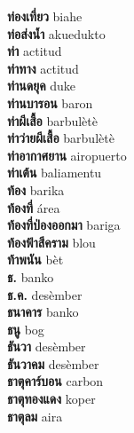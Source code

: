 \textbf{ ท่องเที่ยว  } biahe \\
\textbf{ ท่อส่งน้ำ  } akuedukto \\
\textbf{ ท่า  } actitud \\
\textbf{ ท่าทาง  } actitud \\
\textbf{ ท่านดยุค  } duke \\
\textbf{ ท่านบารอน  } baron \\
\textbf{ ท่าผีเสื้อ  } barbulètè \\
\textbf{ ท่าว่ายผีเสื้อ  } barbulètè \\
\textbf{ ท่าอากาศยาน  } airopuerto \\
\textbf{ ท่าเต้น  } baliamentu \\
\textbf{ ท้อง  } barika \\
\textbf{ ท้องที่  } área \\
\textbf{ ท้องที่ป่องออกมา  } bariga \\
\textbf{ ท้องฟ้าสีคราม  } blou \\
\textbf{ ท้าพนัน  } bèt \\
\textbf{ ธ.  } banko \\
\textbf{ ธ.ค.  } desèmber \\
\textbf{ ธนาคาร  } banko \\
\textbf{ ธนู  } bog \\
\textbf{ ธันวา  } desèmber \\
\textbf{ ธันวาคม  } desèmber \\
\textbf{ ธาตุคาร์บอน  } carbon \\
\textbf{ ธาตุทองแดง  } koper \\
\textbf{ ธาตุลม  } aira \\
